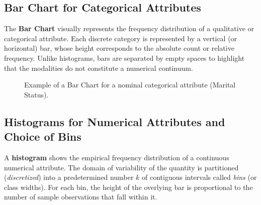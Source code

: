 \subsection{Bar Chart for Categorical Attributes}
The \textbf{Bar Chart} visually represents the frequency distribution of a qualitative or categorical attribute. Each discrete category is represented by a vertical (or horizontal) bar, whose height corresponds to the absolute count or relative frequency. Unlike histograms, bars are separated by empty spaces to highlight that the modalities do not constitute a numerical continuum.

\begin{figure}[H]
\centering
{}
\caption{Example of a Bar Chart for a nominal categorical attribute (Marital Status).}
\label{fig:barchart-example}
\end{figure}

\subsection{Histograms for Numerical Attributes and Choice of Bins}
A \textbf{histogram} shows the empirical frequency distribution of a continuous numerical attribute. The domain of variability of the quantity is partitioned (\textit{discretized}) into a predetermined number $k$ of contiguous intervals called \textit{bins} (or class widths). For each bin, the height of the overlying bar is proportional to the number of sample observations that fall within it.


